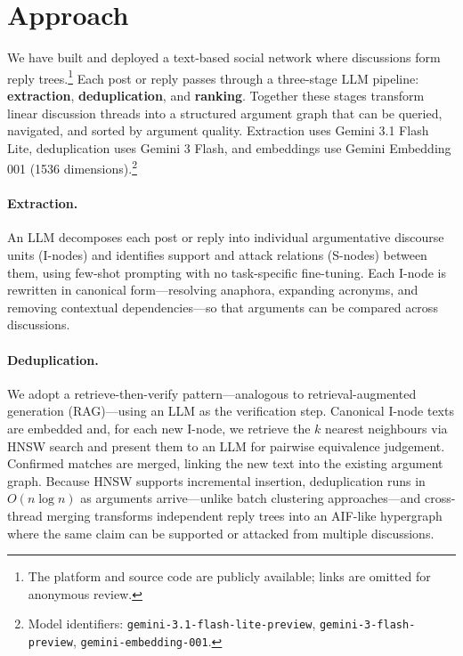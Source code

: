 \section{Approach}

We have built and deployed a text-based social network where discussions form reply trees.\footnote{The platform and source code are publicly available; links are omitted for anonymous review.} Each post or reply passes through a three-stage LLM pipeline: \textbf{extraction}, \textbf{deduplication}, and \textbf{ranking}. Together these stages transform linear discussion threads into a structured argument graph that can be queried, navigated, and sorted by argument quality. Extraction uses Gemini 3.1 Flash Lite, deduplication uses Gemini 3 Flash, and embeddings use Gemini Embedding 001 (1536 dimensions).\footnote{Model identifiers: \texttt{gemini-3.1-flash-lite-preview}, \texttt{gemini-3-flash-preview}, \texttt{gemini-embedding-001}.}

\paragraph{Extraction.} An LLM decomposes each post or reply into individual argumentative discourse units (I-nodes) and identifies support and attack relations (S-nodes) between them, using few-shot prompting with no task-specific fine-tuning. Each I-node is rewritten in canonical form---resolving anaphora, expanding acronyms, and removing contextual dependencies---so that arguments can be compared across discussions.

\paragraph{Deduplication.} We adopt a retrieve-then-verify pattern---analogous to retrieval-augmented generation (RAG)---using an LLM as the verification step. Canonical I-node texts are embedded and, for each new I-node, we retrieve the $k$ nearest neighbours via HNSW search \citep{MalkovYashunin2016} and present them to an LLM for pairwise equivalence judgement. Confirmed matches are merged, linking the new text into the existing argument graph. Because HNSW supports incremental insertion, deduplication runs in $O(n \log n)$ as arguments arrive---unlike batch clustering approaches---and cross-thread merging transforms independent reply trees into an AIF-like hypergraph \citep{Chesnevar:2007:AIF} where the same claim can be supported or attacked from multiple discussions.

